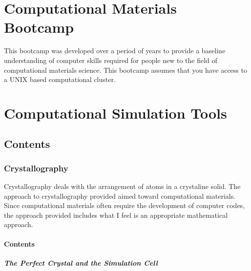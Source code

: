 \documentclass[letterpaper,10pt,english]{sphinxmanual}
\begin{document}
\section{Computational Materials Bootcamp}
\label{\detokenize{bootcamp/index:computational-materials-bootcamp}}\label{\detokenize{bootcamp/index::doc}}
This bootcamp was developed over a period of years to provide a baseline understanding of computer skills required for people new to the field of computational materials science.  This bootcamp assumes that you have access to a UNIX based computational cluster.


\section{Computational Simulation Tools}
\label{\detokenize{computational_simulation_tools:computational-simulation-tools}}\label{\detokenize{computational_simulation_tools::doc}}

\subsection{Contents}
\label{\detokenize{computational_simulation_tools:contents}}

\subsubsection{Crystallography}
\label{\detokenize{crystallography/index:crystallography}}\label{\detokenize{crystallography/index:crystal-lattice}}\label{\detokenize{crystallography/index::doc}}
Crystallography deals with the arrangement of atoms in a crystaline solid.
The approach to crystallography provided aimed toward computational materials.
Since computational materials often require the development of computer codes, the approach provided includes what I feel is an appropriate mathematical approach.


\paragraph{Contents}
\label{\detokenize{crystallography/index:contents}}

\subparagraph{The Perfect Crystal and the Simulation Cell}
\label{\detokenize{crystallography/perfect_crystal:the-perfect-crystal-and-the-simulation-cell}}\label{\detokenize{crystallography/perfect_crystal::doc}}
\end{document}
